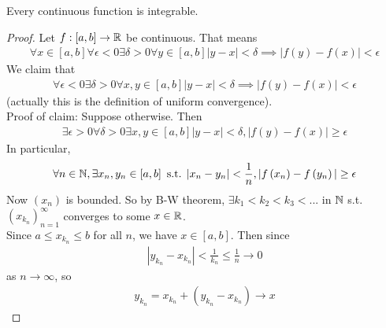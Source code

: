 \documentclass[a4paper]{article}
\begin{document}
\begin{thm}
Every continuous function is integrable.
\begin{proof}
Let $f:\left[a,b\right]\to \mathbb{R}$ be continuous. That means
\begin{equation*}
\begin{aligned}
\forall x\in\left[a,b\right] \forall \epsilon < 0 \exists \delta > 0 \forall y \in \left[a,b\right] |y-x|<\delta \implies |f\left(y\right) - f\left(x\right)|<\epsilon
\end{aligned}
\end{equation*}
We claim that
\begin{equation*}
\begin{aligned}
\forall \epsilon < 0 \exists \delta > 0 \forall x,y\in\left[a,b\right] |y-x|<\delta \implies |f\left(y\right)-f\left(x\right)|<\epsilon
\end{aligned}
\end{equation*}
(actually this is the definition of uniform convergence).\\
Proof of claim: Suppose otherwise. Then
\begin{equation*}
\begin{aligned}
\exists \epsilon > 0 \forall \delta > 0 \exists x,y\in\left[a,b\right] |y-x|<\delta, |f\left(y\right) - f\left(x\right)| \geq \epsilon
\end{aligned}
\end{equation*}
In particular, 
\begin{equation*}
\begin{aligned}
\forall n\in \mathbb{N}, \exists x_n, y_n \in \left[a,b\right] \text{  s.t.  } |x_n-y_n|<\frac{1}{n}, |f\left(x_n\right) - f\left(y_n\right) | \geq \epsilon
\end{aligned}
\end{equation*}
Now $\left(x_n\right)$ is bounded. So by B-W theorem, $\exists k_1<k_2<k_3<...$ in $\mathbb{N}$ s.t. $\left(x_{k_n}\right)_{n=1}^\infty$ converges to some $x\in \mathbb{R}$.\\
Since $a\leq x_{k_n} \leq b$ for all $n$, we have $x\in \left[a,b\right]$. Then since
\begin{equation*}
\begin{aligned}
|y_{k_n}-x_{k_n} | < \frac{1}{k_n} \leq \frac{1}{n} \to 0
\end{aligned}
\end{equation*}
as $n\to\infty$, so
\begin{equation*}
\begin{aligned}
y_{k_n} = x_{k_n} + \left(y_{k_n}-x_{k_n}\right) \to x

\end{aligned}
\end{equation*}
\end{proof}
\end{thm}
\end{document}
